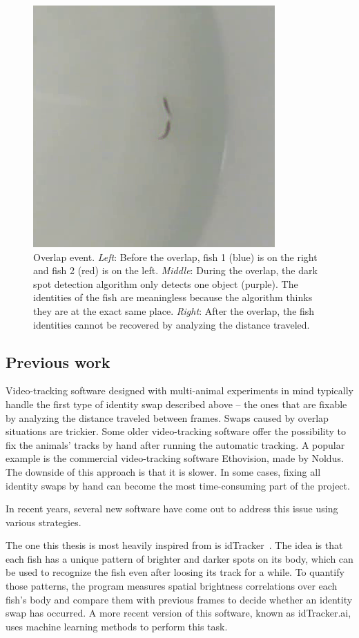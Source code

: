 \documentclass{article}
\newlength{\mylen}
\begin{document}
\begin{figure}[H]
	\includegraphics[height=\mylen]{overlap-event3}
	\caption{Overlap event. 
		\emph{Left}: Before the overlap, fish 1 (blue) is on the right and fish 2 (red) is on the left. 
		\emph{Middle}: During the overlap, the dark spot detection algorithm only detects one object (purple). The identities of the fish are meaningless because the algorithm thinks they are at the exact same place. 
		\emph{Right}: After the overlap, the fish identities cannot be recovered by analyzing the distance traveled.}
	\label{fig:overlap-event}
\end{figure}



\subsection{Previous work}

Video-tracking software designed with multi-animal experiments in mind typically handle the first type of identity swap described above -- the ones that are fixable by analyzing the distance traveled between frames. Swaps caused by overlap situations are trickier. Some older video-tracking software offer the possibility to fix the animals' tracks by hand after running the automatic tracking. A popular example is the commercial video-tracking software Ethovision, made by Noldus. The downside of this approach is that it is slower. In some cases, fixing all identity swaps by hand can become the most time-consuming part of the project. 

In recent years, several new software have come out to address this issue using various strategies.

The one this thesis is most heavily inspired from is idTracker~\cite{perez-escudero_idtracker_2014}. The idea is that each fish has a unique pattern of brighter and darker spots on its body, which can be used to recognize the fish even after loosing its track for a while. To quantify those patterns, the program measures spatial brightness correlations over each fish's body and compare them with previous frames to decide whether an identity swap has occurred. A more recent version of this software, known as idTracker.ai, uses machine learning methods to perform this task.
\end{document}

